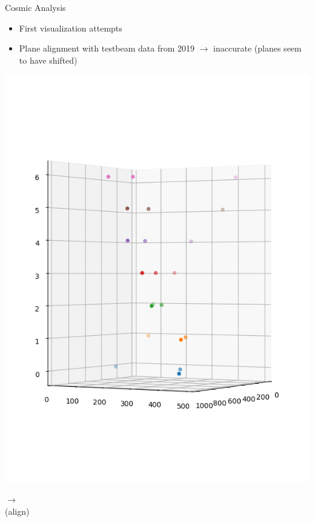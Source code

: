 \documentclass{beamer}
\begin{document}
\begin{frame}{Cosmic Analysis}
    \footnotesize
    \begin{itemize}
	\item First visualization attempts
	\item Plane alignment with testbeam data from 2019 \( \rightarrow \)
	    inaccurate \tiny (planes seem to have shifted) \footnotesize
    \end{itemize}
\begin{minipage}{.45\textwidth}
    \centering
    \includegraphics[trim=0 50 0 100,clip,width=\textwidth]{DESY_Before.png}
\end{minipage}
\begin{minipage}{.05\textwidth}
    \centering
    \( \rightarrow \) \\
    \tiny (align)
\end{minipage}
\begin{minipage}{.45\textwidth}
    \centering

\end{minipage}
\end{frame}
\end{document}
